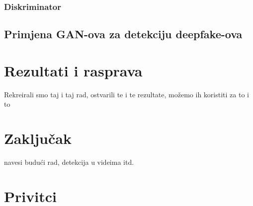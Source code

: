 \documentclass[seminarski, times, utf8]{fer}
\begin{document}
\subsection{Diskriminator}

\section {Primjena GAN-ova za detekciju deepfake-ova}

\chapter{Rezultati i rasprava}
\label{pog:rezultati_i_rasprava}
Rekreirali smo taj i taj rad, ostvarili te i te rezultate, možemo ih koristiti za to i to



\chapter{Zaključak}
navesi budući rad, detekcija u videima itd.
\label{pog:zakljucak}







\chapter{Privitci}
\end{document}
